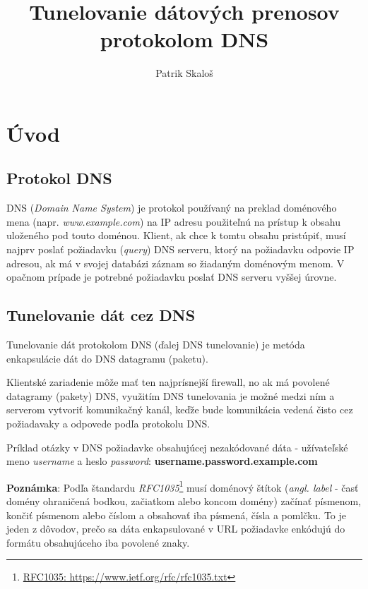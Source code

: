 \documentclass[a4paper]{article}
\title{Tunelovanie dátových prenosov protokolom DNS}
\author{Patrik Skaloš}
\begin{document}
  \renewcommand{\contentsname}{Obsah}

  \maketitle

  \tableofcontents



  \section{Úvod}

  \subsection{Protokol DNS}

  DNS (\emph{Domain Name System}) je protokol používaný na preklad doménového
  mena (napr. \emph{www.example.com}) na IP adresu použiteľnú na prístup k
  obsahu uloženého pod touto doménou. Klient, ak chce k tomtu obsahu pristúpiť,
  musí najprv poslať požiadavku (\emph{query}) DNS serveru, ktorý na požiadavku
  odpovie IP adresou, ak má v svojej databázi záznam so žiadaným doménovým
  menom. V opačnom prípade je potrebné požiadavku poslať DNS serveru vyššej
  úrovne.


  \subsection{Tunelovanie dát cez DNS}

  Tunelovanie dát protokolom DNS (ďalej DNS tunelovanie) je metóda enkapsulácie
  dát do DNS datagramu (paketu). 

  Klientské zariadenie môže mať ten najprísnejší firewall, no ak má
  povolené datagramy (pakety) DNS, využitím DNS tunelovania je možné medzi ním
  a serverom vytvoriť komunikačný kanál, keďže bude komunikácia vedená čisto cez
  požiadavaky a odpovede podľa protokolu DNS.

  Príklad otázky v DNS požiadavke obsahujúcej nezakódované dáta - užívateľské
  meno \emph{username} a heslo \emph{password}:
  \textbf{username.password.example.com}

  \textbf{Poznámka}: Podľa štandardu
  \emph{RFC1035}\footnote{\href{https://www.ietf.org/rfc/rfc1035.txt}{RFC1035:
  https://www.ietf.org/rfc/rfc1035.txt}} musí doménový štítok (\emph{angl.
    label} - časť domény ohraničená bodkou, začiatkom alebo koncom domény)
    začínať písmenom, končiť písmenom alebo číslom a obsahovať iba písmená,
    čísla a pomlčku. To je jeden z dôvodov, prečo sa dáta enkapsulované v URL
    požiadavke enkódujú do formátu obsahujúceho iba povolené znaky.
\end{document}

